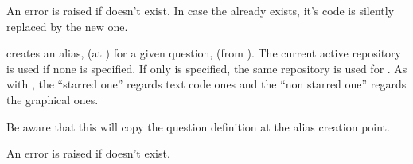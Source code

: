 \documentclass[10pt]{article}
\begin{document}
\begin{tsremark}
An error is raised if  doesn't exist. In case the  already exists, it's code is silently replaced by the new one.
\end{tsremark}


\begin{codedescribe}[code,update={2025-04-25}]{}
\begin{codesyntax}%
\end{codesyntax}
 creates an alias,  (at ) for a given question,  (from ). The current active repository is used if none is specified. If only  is specified, the same repository is used for . As with , the ``starred one'' regards text code ones and the ``non starred one'' regards the graphical ones.
\end{codedescribe}


\begin{tsremark}
Be aware that this will copy the question definition at the alias creation point.
\end{tsremark}

\begin{tsremark}
An error is raised if  doesn't exist.
\end{tsremark}
\end{document}

